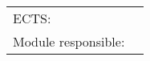 \ 
\vspace{5cm}

\begin{center}

	
	\Large \textbf \organisatie
	
	\vspace{1.5cm}
	
	\HRule \\[0.4cm]
	
	\Huge \textbf \modulenaam
	
	\vspace{1.7cm}
	
	\Large \textbf  \modulecode
	
	\vspace{0.4cm}
	
	\HRule \\[1.5cm]
\end{center}
\vfill

\begin{tabular}{l l}
	ECTS:  & \stdPunten\\
	Module responsible: & \author\\
\end{tabular}
